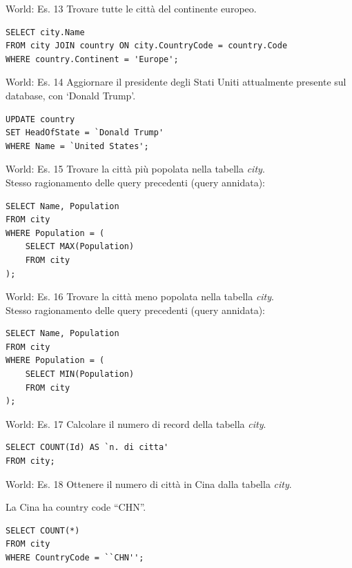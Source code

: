 %
\begin{frame}[fragile]{World: Es. 13}
Trovare tutte le citt\`a del continente europeo.
\pause
\begin{lstlisting}
SELECT city.Name
FROM city JOIN country ON city.CountryCode = country.Code
WHERE country.Continent = 'Europe';
\end{lstlisting}
\end{frame}
%
\begin{frame}[fragile]{World: Es. 14}
Aggiornare il presidente degli Stati Uniti attualmente presente sul database, con `Donald Trump'.
\pause
\begin{lstlisting}
UPDATE country
SET HeadOfState = `Donald Trump'
WHERE Name = `United States';
\end{lstlisting}
\end{frame}
%
\begin{frame}[fragile]{World: Es. 15}
Trovare la citt\`a pi\`u popolata nella tabella \textit{city}.
\pause
\newline
\\Stesso ragionamento delle query precedenti (query annidata):
\begin{lstlisting}
SELECT Name, Population
FROM city
WHERE Population = (
    SELECT MAX(Population)
    FROM city
);
\end{lstlisting}
\end{frame}
%
\begin{frame}[fragile]{World: Es. 16}
Trovare la citt\`a meno popolata nella tabella \textit{city}.
\pause
\newline
\\Stesso ragionamento delle query precedenti (query annidata):
\begin{lstlisting}
SELECT Name, Population
FROM city
WHERE Population = (
    SELECT MIN(Population)
    FROM city
);
\end{lstlisting}
\end{frame}
%
\begin{frame}[fragile]{World: Es. 17}
Calcolare il numero di record della tabella \textit{city}.
\pause
\begin{lstlisting}
SELECT COUNT(Id) AS `n. di citta'
FROM city;
\end{lstlisting}
\end{frame}
%
\begin{frame}[fragile]{World: Es. 18}
Ottenere il numero di citt\`a in Cina dalla tabella \textit{city}.

La Cina ha country code ``CHN''.
\pause
\begin{lstlisting}
SELECT COUNT(*)
FROM city
WHERE CountryCode = ``CHN'';
\end{lstlisting}
\end{frame}
%